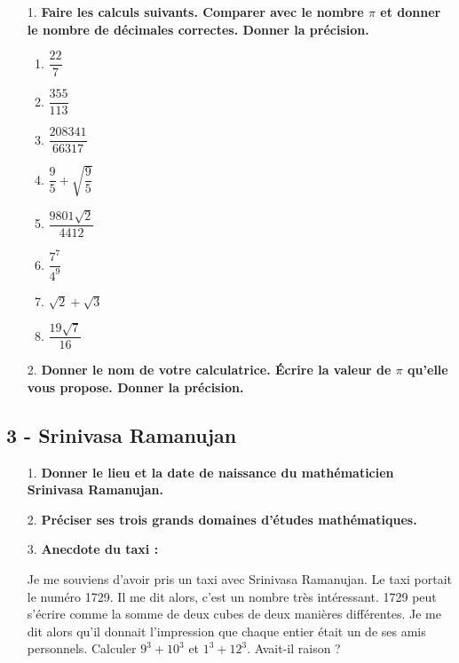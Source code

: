 \documentclass[11pt]{article}
\begin{document}
\begin{enumerate}
\item[1.] \textbf{Faire les calculs suivants. Comparer avec le nombre $\pi$ et donner le nombre de décimales correctes. Donner la précision.}

  \begin{multicols}{3}
  \begin{enumerate}
    \item $\dfrac{22}{7} $
    \item $\dfrac{355}{113} $
    \item $\dfrac{208341}{66317} $
    \item $\dfrac{9}{5} + \sqrt{\dfrac{9}{5}} $
    \item $\dfrac {9801{\sqrt {2}}}{4412}$
    \item $\dfrac{7^7}{4^9} $
    \item $\sqrt{2} + \sqrt{3} $
    \item $\dfrac {19\sqrt{7}}{16} $
  \end{enumerate}
  \end{multicols}

\item[2.] \textbf{Donner le nom de votre calculatrice. Écrire la valeur de $\pi$ qu'elle vous propose. Donner la précision.}
\end{enumerate}

\vspace{-0.4cm}
\subsection*{3 - Srinivasa Ramanujan}

\begin{enumerate}
  \item[1.] \textbf{Donner le lieu et la date de naissance du mathématicien Srinivasa Ramanujan.}
  \item[2.] \textbf{Préciser ses trois grands domaines d'études mathématiques.}
  \item[3.] \textbf{Anecdote du taxi :}

    {\selectfont 
     \og Je me souviens d'avoir pris un taxi avec Srinivasa Ramanujan. Le taxi portait le numéro 1729. Il me dit alors, c'est un nombre très intéressant. 1729 peut s'écrire comme la somme de deux cubes de deux manières différentes. Je me dit alors qu'il donnait l'impression que chaque entier était un de ses amis personnels.\fg
    }
    Calculer $9^{3}+10^{3}$ et $1^{3}+12^{3}$. Avait-il raison ?
 \end{enumerate}
\end{document}
